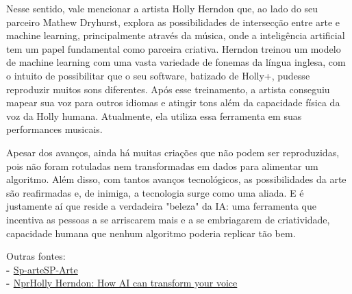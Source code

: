 {\hspace*{1.5em} Nesse sentido, vale mencionar a artista 
Holly Herndon que, ao lado do seu parceiro 
Mathew Dryhurst, explora as possibilidades de 
intersecção entre arte e machine learning, 
principalmente através da música, onde a 
inteligência 
artificial 
tem um papel 
fundamental como parceira criativa. Herndon 
treinou um modelo de machine learning com 
uma vasta variedade de fonemas da língua 
inglesa, com o intuito de possibilitar que o seu 
software, batizado de Holly+, pudesse 
reproduzir muitos sons diferentes. Após esse 
treinamento, a artista conseguiu mapear sua 
voz para outros idiomas e atingir tons além da 
capacidade física da voz da Holly humana. 
Atualmente, ela utiliza essa ferramenta em 
suas performances musicais.


\subtitle{Conclusão}
\hspace*{1.5em} Apesar dos avanços, ainda há muitas 
criações que não podem ser reproduzidas, 
pois não foram rotuladas nem transformadas 
em dados para alimentar um algoritmo. Além 
disso, com tantos avanços tecnológicos, as 
possibilidades da arte são reafirmadas e, de 
inimiga, a tecnologia surge como uma aliada. 
E é justamente aí que reside a verdadeira 
"beleza" da IA: uma ferramenta que incentiva 
as pessoas a se arriscarem mais e a se 
embriagarem de criatividade, capacidade 
humana que nenhum algoritmo poderia 
replicar tão bem.

    \textcolor{HypePurple2}{Outras fontes:}\\
\textbf{\textcolor{HypePurple2}{- }}\href{https://www.sp-arte.com/editorial/a-arte-diante-da-inteligencia-artificial}{Sp-arteSP-Arte}\\
\textbf{\textcolor{HypePurple2}{- }}\href{https://www.npr.org/transcripts/1119220726}{NprHolly Herndon: How AI can transform your voice}


}